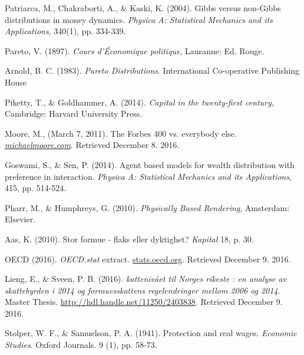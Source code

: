 \documentclass[10pt, a4paper]{amsart}
\begin{document}
\begin{thebibliography}{10}

 Patriarca, M., Chakraborti, A., \& Kaski, K. (2004). 
	Gibbs versus non-Gibbs distributions in money dynamics. 
	\emph{Physica A: Statistical Mechanics and its Applications},
	340(1), pp. 334-339.
	
 Pareto, V. (1897).
	\emph{Cours d'Économique politique},
	Lausanne: Ed. Rouge.

 Arnold, B. C. (1983). 
	\emph{Pareto Distributions}.
	 International Co-operative Publishing House	

 Piketty, T., \& Goldhammer, A. (2014).
	\emph{Capital in the twenty-first century},
	Cambridge: Harvard University Press.
	
 Moore, M., (March 7, 2011).
	The Forbes 400 vs. everybody else.
	\emph{\href{https://web.archive.org/web/20110309211959/http://www.michaelmoore.com/words/must-read/forbes-400-vs-everybody-else}{michaelmoore.com}}.
	Retrieved December 8. 2016.

 Goswami, S., \& Sen, P. (2014).
	Agent based models for wealth distribution with preference in interaction.
	\emph{Physica A: Statistical Mechanics and its Applications},
	415, pp. 514-524.
	
 Pharr, M., \& Humphreys, G. (2010).
	\emph{Physically Based Rendering}, 
	Amsterdam: Elsevier.
	
 Aas, K. (2010).
	Stor formue - flaks eller dyktighet?
	\emph{Kapital} 18, p. 30.
	
 OECD (2016). 
	\emph{OECD.stat} extract.
	\url{stats.oecd.org}. 
	Retrieved December 9. 2016.
	
 Lieng, E., \& Sveen, P. B. (2016).
	\emph{kattenivået til Norges rikeste : en analyse av skattebyrden i 2014 og formuesskattens regelendringer mellom 2006 og 2014}.
	Master Thesis. 
	\url{http://hdl.handle.net/11250/2403838}.
	Retrieved December 9. 2016.

  Stolper, W. F., \& Samuelson, P. A. (1941).
	Protection and real wages.
	\emph{Economic Studies}. Oxford Journals.
	9 (1), pp. 58-73.
	
\end{thebibliography}
	
\end{document}
